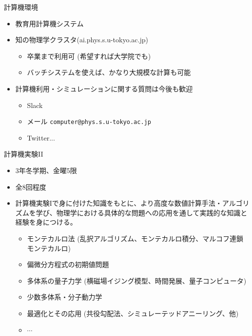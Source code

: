 \documentclass[10pt,dvipdfmx]{beamer}
\begin{document}

\begin{frame}[t,fragile]{計算機環境}
  \begin{itemize}
  \item 教育用計算機システム
  \item 知の物理学クラスタ(ai.phys.s.u-tokyo.ac.jp)
    \begin{itemize}
    \item 卒業まで利用可 (希望すれば大学院でも)
    \item バッチシステムを使えば、かなり大規模な計算も可能
    \end{itemize}
  \item 計算機利用・シミュレーションに関する質問は今後も歓迎
    \begin{itemize}
      \item Slack
      \item メール {\tt computer@phys.s.u-tokyo.ac.jp}
      \item Twitter...
    \end{itemize}
  \end{itemize}
\end{frame}

\begin{frame}[t,fragile]{計算機実験II}
  \begin{itemize}
  \item 3年冬学期、金曜5限
  \item 全8回程度
  \item 計算機実験Iで身に付けた知識をもとに、より高度な数値計算手法・アルゴリズムを学び、物理学における具体的な問題への応用を通して実践的な知識と経験を身につける。
    \begin{itemize}
      \item モンテカルロ法 (乱択アルゴリズム、モンテカルロ積分、マルコフ連鎖モンテカルロ)
      \item 偏微分方程式の初期値問題
      \item 多体系の量子力学 (横磁場イジング模型、時間発展、量子コンピュータ)
      \item 少数多体系・分子動力学
      \item 最適化とその応用 (共役勾配法、シミュレーテッドアニーリング、他)
      \item $\cdots$
    \end{itemize}
  \end{itemize}
\end{frame}
\end{document}
